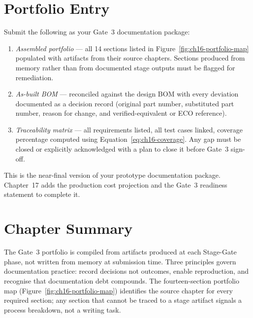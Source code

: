 \section*{Portfolio Entry}
\label{sec:ch16-artifact}

Submit the following as your Gate~3 documentation package:

\begin{enumerate}
  \item[(a)] \textit{Assembled portfolio} --- all 14 sections listed in
        Figure~\ref{fig:ch16-portfolio-map} populated with artifacts from their
        source chapters.
        Sections produced from memory rather than from documented stage outputs
        must be flagged for remediation.

  \item[(b)] \textit{As-built BOM} --- reconciled against the design BOM with
        every deviation documented as a decision record (original part number,
        substituted part number, reason for change, and verified-equivalent or
        ECO reference).

  \item[(c)] \textit{Traceability matrix} --- all requirements listed, all
        test cases linked, coverage percentage computed using
        Equation~\ref{eq:ch16-coverage}.
        Any gap must be closed or explicitly acknowledged with a plan to close
        it before Gate~3 sign-off.
\end{enumerate}

This is the near-final version of your prototype documentation package.
Chapter~17 adds the production cost projection and the Gate~3 readiness
statement to complete it.

\section*{Chapter Summary}
\label{sec:ch16-summary}

The Gate~3 portfolio is compiled from artifacts produced at each Stage-Gate
phase, not written from memory at submission time.
Three principles govern documentation practice: record decisions not outcomes,
enable reproduction, and recognise that documentation debt compounds.
The fourteen-section portfolio map (Figure~\ref{fig:ch16-portfolio-map})
identifies the source chapter for every required section; any section that
cannot be traced to a stage artifact signals a process breakdown, not a writing
task.

